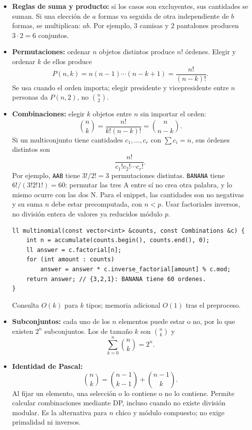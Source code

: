 \begin{itemize}
  \item \textbf{Reglas de suma y producto:} si los casos son excluyentes, sus
  cantidades se suman. Si una elecci\'on de $a$ formas va seguida de otra
  independiente de $b$ formas, se multiplican: $ab$. Por ejemplo, $3$ camisas y
  $2$ pantalones producen $3\cdot2=6$ conjuntos.
  \item \textbf{Permutaciones:} ordenar $n$ objetos distintos produce $n!$
  \'ordenes. Elegir y ordenar $k$ de ellos produce
  \[
      P(n,k)=n(n-1)\cdots(n-k+1)=\frac{n!}{(n-k)!}.
  \]
  Se usa cuando el orden importa; elegir presidente y vicepresidente entre $n$
  personas da $P(n,2)$, no $\binom n2$.
  \item \textbf{Combinaciones:} elegir $k$ objetos entre $n$ sin importar el
  orden:
  \[
      \binom nk=\frac{n!}{k!(n-k)!}=\binom n{n-k}.
  \]
  Si un multiconjunto tiene cantidades $c_1,\ldots,c_r$ con $\sum c_i=n$, sus
  \'ordenes distintos son
  \[
      \frac{n!}{c_1!c_2!\cdots c_r!}.
  \]
  Por ejemplo, \texttt{AAB} tiene $3!/2!=3$ permutaciones distintas.
  \texttt{BANANA} tiene $6!/(3!2!1!)=60$: permutar las tres A entre s\'i no
  crea otra palabra, y lo mismo ocurre con las dos N.
  Para el snippet, las cantidades son no negativas y su suma $n$ debe estar
  precomputada, con $n<p$. Usar factoriales inversos, no divisi\'on entera
  de valores ya reducidos m\'odulo $p$.

\begin{lstlisting}[style=cpp]
ll multinomial(const vector<int> &counts, const Combinations &c) {
    int n = accumulate(counts.begin(), counts.end(), 0);
    ll answer = c.factorial[n];
    for (int amount : counts)
        answer = answer * c.inverse_factorial[amount] % c.mod;
    return answer; // {3,2,1}: BANANA tiene 60 ordenes.
}
\end{lstlisting}

  Consulta $O(k)$ para $k$ tipos; memoria adicional $O(1)$ tras el preproceso.
  \item \textbf{Subconjuntos:} cada uno de los $n$ elementos puede estar o no,
  por lo que existen $2^n$ subconjuntos. Los de tama\~no $k$ son $\binom nk$ y
  \[
      \sum_{k=0}^n\binom nk=2^n.
  \]
  \item \textbf{Identidad de Pascal:}
  \[
      \binom nk=\binom{n-1}{k-1}+\binom{n-1}{k}.
  \]
  Al fijar un elemento, una selecci\'on o lo contiene o no lo contiene. Permite
  calcular combinaciones mediante DP, incluso cuando no existe divisi\'on
  modular. Es la alternativa para $n$ chico y m\'odulo compuesto; no exige
  primalidad ni inversos.


\end{itemize}
